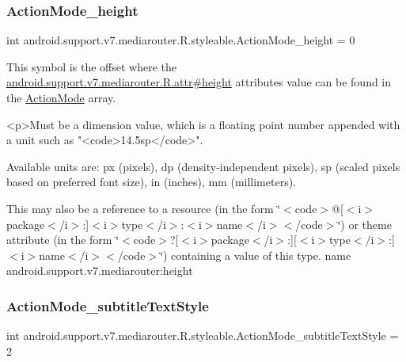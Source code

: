 \subsubsection{\texorpdfstring{Action\+Mode\+\_\+height}{ActionMode\_height}}
{\footnotesize\ttfamily int android.\+support.\+v7.\+mediarouter.\+R.\+styleable.\+Action\+Mode\+\_\+height = 0\hspace{0.3cm}{\ttfamily [static]}}

This symbol is the offset where the \hyperlink{classandroid_1_1support_1_1v7_1_1mediarouter_1_1R_1_1attr_ac2d0839f9c7aaf7042df6d5beda43613}{android.\+support.\+v7.\+mediarouter.\+R.\+attr\#height} attribute\textquotesingle{}s value can be found in the \hyperlink{classandroid_1_1support_1_1v7_1_1mediarouter_1_1R_1_1styleable_a4aa490e6088a98056876d4f9227193c8}{Action\+Mode} array.

\begin{DoxyVerb}      <p>Must be a dimension value, which is a floating point number appended with a unit such as "<code>14.5sp</code>".
\end{DoxyVerb}
 Available units are\+: px (pixels), dp (density-\/independent pixels), sp (scaled pixels based on preferred font size), in (inches), mm (millimeters). 

This may also be a reference to a resource (in the form \char`\"{}$<$code$>$@\mbox{[}$<$i$>$package$<$/i$>$\+:\mbox{]}$<$i$>$type$<$/i$>$\+:$<$i$>$name$<$/i$>$$<$/code$>$\char`\"{}) or theme attribute (in the form \char`\"{}$<$code$>$?\mbox{[}$<$i$>$package$<$/i$>$\+:\mbox{]}\mbox{[}$<$i$>$type$<$/i$>$\+:\mbox{]}$<$i$>$name$<$/i$>$$<$/code$>$\char`\"{}) containing a value of this type.  name android.\+support.\+v7.\+mediarouter\+:height \mbox{\label{classandroid_1_1support_1_1v7_1_1mediarouter_1_1R_1_1styleable_a7c9b319454742dd79494960a4a144757}} 
\subsubsection{\texorpdfstring{Action\+Mode\+\_\+subtitle\+Text\+Style}{ActionMode\_subtitleTextStyle}}
{\footnotesize\ttfamily int android.\+support.\+v7.\+mediarouter.\+R.\+styleable.\+Action\+Mode\+\_\+subtitle\+Text\+Style = 2\hspace{0.3cm}{\ttfamily [static]}}

